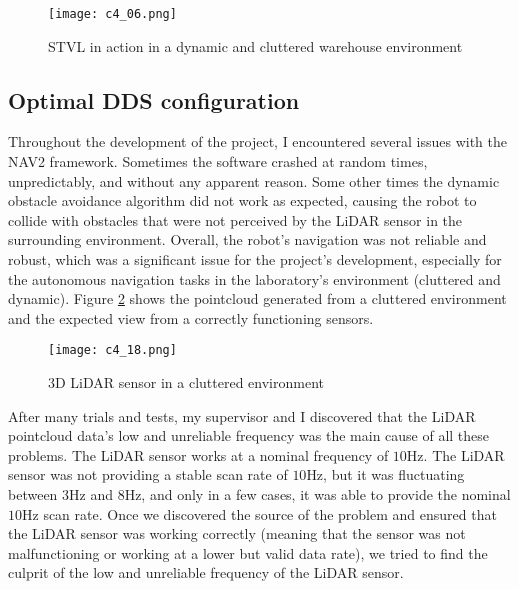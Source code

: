 \begin{figure}[t]
    \centering
    \texttt{[image: c4\_06.png]}
    \caption{STVL in action in a dynamic and cluttered warehouse environment}
    \label{fig:stvl}
\end{figure}


\subsection{Optimal DDS configuration}

Throughout the development of the project, I encountered several issues with the NAV2 framework.
Sometimes the software crashed at random times, unpredictably, and without any apparent reason.
Some other times the dynamic obstacle avoidance algorithm did not work as expected, causing the robot to collide
with obstacles that were not perceived by the LiDAR sensor in the surrounding environment.
Overall, the robot's navigation was not reliable and robust, which was a significant issue for the project's development,
especially for the autonomous navigation tasks in the laboratory's environment (cluttered and dynamic).
Figure \ref{fig:3dlidar} shows the pointcloud generated from a cluttered environment and the expected view 
from a correctly functioning sensors.

\begin{figure}[t]
    \centering
    \texttt{[image: c4\_18.png]}
    \caption{3D LiDAR sensor in a cluttered environment}
    \label{fig:3dlidar}
\end{figure}

After many trials and tests, my supervisor and I discovered that the LiDAR pointcloud data's low and unreliable frequency
was the main cause of all these problems. The LiDAR sensor works at a nominal frequency of $10$Hz. 
The LiDAR sensor was not providing a stable scan rate of $10$Hz, but it was fluctuating between $3$Hz and $8$Hz, 
and only in a few cases, it was able to provide the nominal $10$Hz scan rate.
Once we discovered the source of the problem and ensured that the LiDAR sensor was working correctly
(meaning that the sensor was not malfunctioning or working at a lower but valid data rate), 
we tried to find the culprit of the low and unreliable frequency of the LiDAR sensor.

